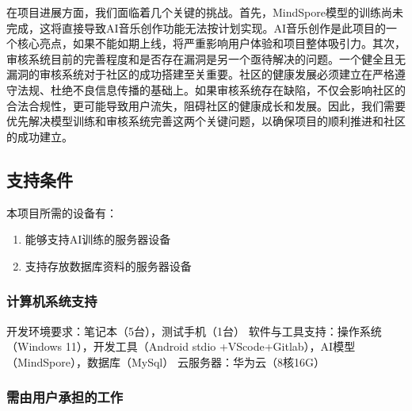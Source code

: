 \documentclass{base}
\numberwithin{figure}{section} %
\begin{document}
在项目进展方面，我们面临着几个关键的挑战。首先，MindSpore模型的训练尚未完成，这将直接导致AI音乐创作功能无法按计划实现。AI音乐创作是此项目的一个核心亮点，如果不能如期上线，将严重影响用户体验和项目整体吸引力。其次，审核系统目前的完善程度和是否存在漏洞是另一个亟待解决的问题。一个健全且无漏洞的审核系统对于社区的成功搭建至关重要。社区的健康发展必须建立在严格遵守法规、杜绝不良信息传播的基础上。如果审核系统存在缺陷，不仅会影响社区的合法合规性，更可能导致用户流失，阻碍社区的健康成长和发展。因此，我们需要优先解决模型训练和审核系统完善这两个关键问题，以确保项目的顺利推进和社区的成功建立。

\subsection{支持条件}

本项目所需的设备有：

\begin{enumerate}
    \item 能够支持AI训练的服务器设备
    \item 支持存放数据库资料的服务器设备
\end{enumerate}

\subsubsection{计算机系统支持}

开发环境要求：笔记本（5台），测试手机（1台）
软件与工具支持：操作系统（Windows 11），开发工具（Android stdio +VScode+Gitlab），AI模型（MindSpore），数据库（MySql）
云服务器：华为云（8核16G）

\subsubsection{需由用户承担的工作}
\end{document}
